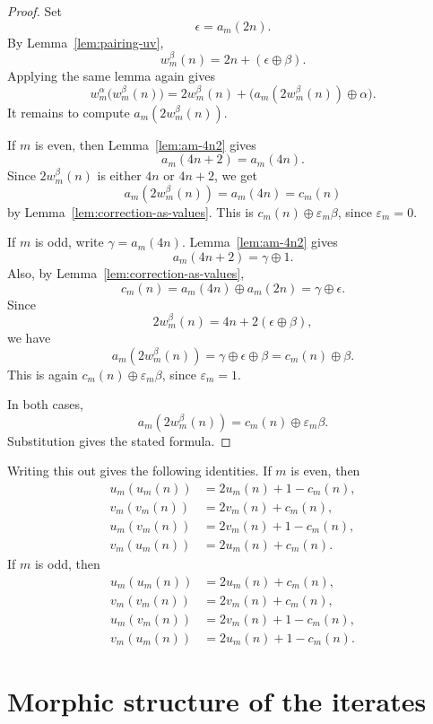 \documentclass[12pt,reqno]{article}
\theoremstyle{plain}
\theoremstyle{definition}
\begin{document}
\begin{proof}
Set
\[
  \epsilon=a_m(2n).
\]
By Lemma~\ref{lem:pairing-uv},
\[
  w_m^\beta(n)=2n+(\epsilon\oplus\beta).
\]
Applying the same lemma again gives
\[
  w_m^\alpha\bigl(w_m^\beta(n)\bigr)
  =2w_m^\beta(n)
   +\bigl(a_m(2w_m^\beta(n))\oplus\alpha\bigr).
\]
It remains to compute \(a_m(2w_m^\beta(n))\).

If \(m\) is even, then Lemma~\ref{lem:am-4n2} gives
\[
  a_m(4n+2)=a_m(4n).
\]
Since \(2w_m^\beta(n)\) is either \(4n\) or \(4n+2\), we get
\[
  a_m(2w_m^\beta(n))=a_m(4n)=c_m(n)
\]
by Lemma~\ref{lem:correction-as-values}. This is
\(c_m(n)\oplus \varepsilon_m\beta\), since \(\varepsilon_m=0\).

If \(m\) is odd, write \(\gamma=a_m(4n)\). Lemma~\ref{lem:am-4n2}
gives
\[
  a_m(4n+2)=\gamma\oplus1.
\]
Also, by Lemma~\ref{lem:correction-as-values},
\[
  c_m(n)=a_m(4n)\oplus a_m(2n)=\gamma\oplus\epsilon.
\]
Since
\[
  2w_m^\beta(n)=4n+2(\epsilon\oplus\beta),
\]
we have
\[
  a_m(2w_m^\beta(n))
  =\gamma\oplus\epsilon\oplus\beta
  =c_m(n)\oplus\beta.
\]
This is again \(c_m(n)\oplus\varepsilon_m\beta\), since
\(\varepsilon_m=1\).

In both cases,
\[
  a_m(2w_m^\beta(n))=c_m(n)\oplus\varepsilon_m\beta.
\]
Substitution gives the stated formula.
\end{proof}

Writing this out gives the following identities. If \(m\) is even, then
\[
\begin{aligned}
  u_m(u_m(n)) &= 2u_m(n)+1-c_m(n),\\
  v_m(v_m(n)) &= 2v_m(n)+c_m(n),\\
  u_m(v_m(n)) &= 2v_m(n)+1-c_m(n),\\
  v_m(u_m(n)) &= 2u_m(n)+c_m(n).
\end{aligned}
\]
If \(m\) is odd, then
\[
\begin{aligned}
  u_m(u_m(n)) &= 2u_m(n)+c_m(n),\\
  v_m(v_m(n)) &= 2v_m(n)+c_m(n),\\
  u_m(v_m(n)) &= 2v_m(n)+1-c_m(n),\\
  v_m(u_m(n)) &= 2u_m(n)+1-c_m(n).
\end{aligned}
\]
\section{Morphic structure of the iterates}
\label{sec:morphismes}
\label{sec:morphic}
\end{document}
